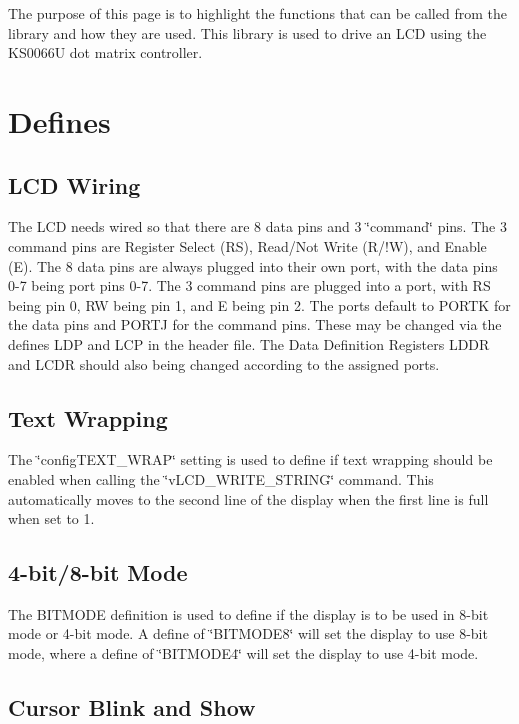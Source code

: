 The purpose of this page is to highlight the functions that can be called from the library and how they are used. This library is used to drive an L\-C\-D using the K\-S0066\-U dot matrix controller.\hypertarget{_usage_Defines}{}\section{Defines}\label{_usage_Defines}
\hypertarget{_usage_Wiring}{}\subsection{L\-C\-D Wiring}\label{_usage_Wiring}
The L\-C\-D needs wired so that there are 8 data pins and 3 \char`\"{}command\char`\"{} pins. The 3 command pins are Register Select (R\-S), Read/\-Not Write (R/!\-W), and Enable (E). The 8 data pins are always plugged into their own port, with the data pins 0-\/7 being port pins 0-\/7. The 3 command pins are plugged into a port, with R\-S being pin 0, R\-W being pin 1, and E being pin 2. The ports default to P\-O\-R\-T\-K for the data pins and P\-O\-R\-T\-J for the command pins. These may be changed via the defines L\-D\-P and L\-C\-P in the header file. The Data Definition Registers L\-D\-D\-R and L\-C\-D\-R should also being changed according to the assigned ports.\hypertarget{_usage_wrap}{}\subsection{Text Wrapping}\label{_usage_wrap}
The \char`\"{}config\-T\-E\-X\-T\-\_\-\-W\-R\-A\-P\char`\"{} setting is used to define if text wrapping should be enabled when calling the \char`\"{}v\-L\-C\-D\-\_\-\-W\-R\-I\-T\-E\-\_\-\-S\-T\-R\-I\-N\-G\char`\"{} command. This automatically moves to the second line of the display when the first line is full when set to 1.\hypertarget{_usage_bitmode}{}\subsection{4-\/bit/8-\/bit Mode}\label{_usage_bitmode}
The B\-I\-T\-M\-O\-D\-E definition is used to define if the display is to be used in 8-\/bit mode or 4-\/bit mode. A define of \char`\"{}\-B\-I\-T\-M\-O\-D\-E8\char`\"{} will set the display to use 8-\/bit mode, where a define of \char`\"{}\-B\-I\-T\-M\-O\-D\-E4\char`\"{} will set the display to use 4-\/bit mode.\hypertarget{_usage_Cursor}{}\subsection{Cursor Blink and Show}\label{_usage_Cursor}
